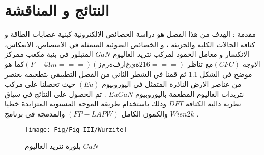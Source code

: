 \chapter{النتائج و المناقشة } %

\label{Chapter3} %

مقدمة :
الهدف من هذا الفصل هو دراسة الخصائص الالكترونية كبنية عصابات الطاقة و كثافة الحالات الكلية والجزيئة ، و الخصائص الضوئية المتمثلة في الامتصاص، الانعكاس، الانكسار و معامل الخمود لمركب نتريد الغاليوم $ GaN $ المتبلور في بنية مكعب ممركز الاوجه $ (CFC)  $مع تناظر $ (F-43m ===) (زمرة فراغية 216===)  $كما هو موضح في الشكل \ref{fig:wurzite} ثم قمنا في الشطر الثاني من الفصل التطبيقي بتطعيمه بعنصر من عناصر الارض الناذرة المتمثل في اليوروبيوم $ ( Eu ) $ حيث تحصلنا على مركب نتريدات الغاليوم المطعمة باليوروبيوم $ EuGaN $ . تم الحصول على النتائج في سياق نظرية دالية الكثافة $ DFT $ وذلك باستخدام طريقة الموجة المستوية المتزايدة خطيا والكمون الكامل $ (FP-LAPW) $ والمدمجة في برنامج $ Wien2k $ .

\begin{figure}[h!]
	\centering
	\texttt{[image: Fig/Fig\_III/Wurzite]}
	\caption{بلورة نتريد الغاليوم $ GaN $}
	\label{fig:wurzite}
\end{figure}

